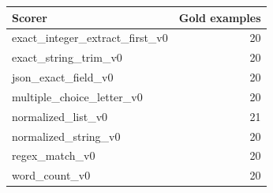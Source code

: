 \begin{tabular}{lr}
\toprule
Scorer & Gold examples \\
\midrule
exact\_integer\_extract\_first\_v0 & 20 \\
exact\_string\_trim\_v0 & 20 \\
json\_exact\_field\_v0 & 20 \\
multiple\_choice\_letter\_v0 & 20 \\
normalized\_list\_v0 & 21 \\
normalized\_string\_v0 & 20 \\
regex\_match\_v0 & 20 \\
word\_count\_v0 & 20 \\
\bottomrule
\end{tabular}

